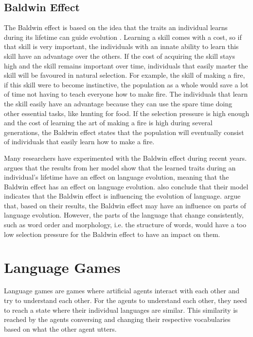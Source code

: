 \subsection{Baldwin Effect}
The Baldwin effect is based on the idea that the traits an individual learns during its lifetime can guide evolution \citep{baldwin1896new}. Learning a skill comes with a cost, so if that skill is very important, the individuals with an innate ability to learn this skill have an advantage over the others. If the cost of acquiring the skill stays high and the skill remains important over time, individuals that easily master the skill will be favoured in natural selection. For example, the skill of making a fire, if this skill were to become instinctive, the population as a whole would save a lot of time not having to teach everyone how to make fire. The individuals that learn the skill easily have an advantage because they can use the spare time doing other essential tasks, like hunting for food. If the selection pressure is high enough and the cost of learning the art of making a fire is high during several generations, the Baldwin effect states that the population will eventually consist of individuals that easily learn how to make a fire.

Many researchers have experimented with the Baldwin effect during recent years. \citet{lipowska2011naming} argues that the results from her model show that the learned traits during an individual's lifetime have an effect on language evolution, meaning that the Baldwin effect has an effect on language evolution. \citet{zollman2010plasticity} also conclude that their model indicates that the Baldwin effect is influencing the evolution of language. \citet{chater2010language} argue that, based on their results, the Baldwin effect may have an influence on parts of language evolution. However, the parts of the language that change consistently, such as word order and morphology, i.e. the structure of words, would have a too low selection pressure for the Baldwin effect to have an impact on them.


\section{Language Games}
Language games are games where artificial agents interact with each other and try to understand each other. For the agents to understand each other, they need to reach a state where their individual languages are similar. This similarity is reached by the agents conversing and changing their respective vocabularies based on what the other agent utters.

